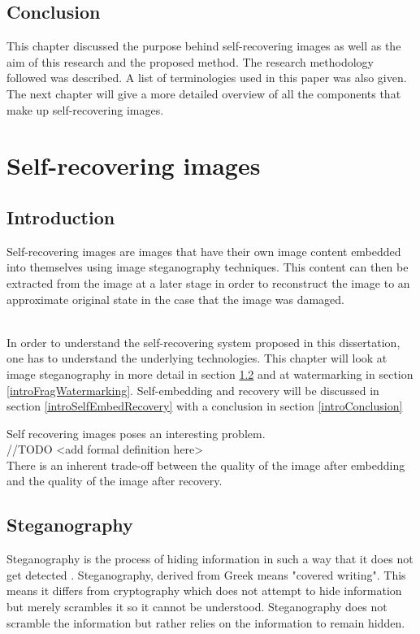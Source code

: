 \documentclass[12pt]{article}
\begin{document}
\subsection{Conclusion}
This chapter discussed the purpose behind self-recovering images as well as the aim of this research and the proposed method. 
The research methodology followed was described. A list of terminologies used in this paper was also given.
The next chapter will give a more detailed overview of all the components that make up self-recovering images. 

\section{Self-recovering images}

\subsection{Introduction}
Self-recovering images are images that have their own image content embedded into themselves using image steganography techniques. 
This content can then be extracted from the image at a later stage in order to reconstruct the image to an approximate original state in the case that the image was damaged.

\hspace{0pt} \\
In order to understand the self-recovering system proposed in this dissertation, one has to understand the underlying technologies.  This chapter will look at image steganography in more detail in section \ref{introSteganography} and at watermarking in section \ref{introFragWatermarking}. Self-embedding and recovery will be discussed in section \ref{introSelfEmbedRecovery} with a conclusion in section \ref{introConclusion}

Self recovering images poses an interesting problem.
\hspace{0pt} \\
//TODO <add formal definition here>
\hspace{0pt} \\
There is an inherent trade-off between the quality of the image after embedding and the quality of the image after recovery.

\subsection{Steganography}
\label{introSteganography}
Steganography is the process of hiding information in such a way that it does not get detected \cite{johnson1998exploring}.
Steganography, derived from Greek means "covered writing".
This means it differs from cryptography which does not attempt to hide information but merely scrambles it so it cannot be understood.
Steganography does not scramble the information but rather relies on the information to remain hidden.
\end{document}
